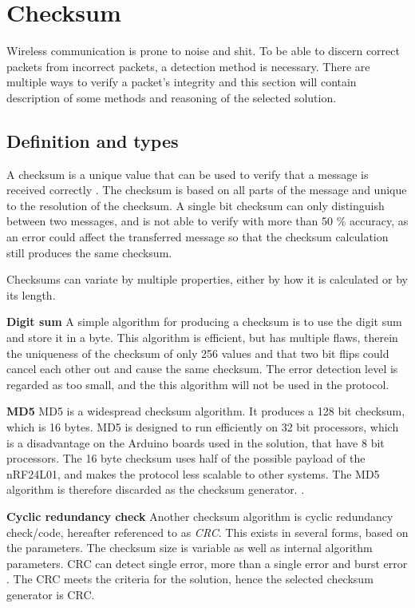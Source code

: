 \section{Checksum}
Wireless communication is prone to noise and shit\cite{source}. To be able to discern correct packets from incorrect packets, a detection method is necessary. There are multiple ways to verify a packet's integrity and this section will contain description of some methods and reasoning of the selected solution.

\subsection{Definition and types}
A checksum is a unique value that can be used to verify that a message is received correctly \cite{datapakke}. The checksum is based on all parts of the message and unique to the resolution of the checksum. 
A single bit checksum can only distinguish between two messages, and is not able to verify with more than 50 \% accuracy, as an error could affect the transferred message so that the checksum calculation still produces the same checksum.

Checksums can variate by multiple properties, either by how it is calculated or by its length. 

\textbf{Digit sum}\newline
A simple algorithm for producing a checksum is to use the digit sum and store it in a byte. This algorithm is efficient, but has multiple flaws, therein the uniqueness of the checksum of only 256 values and that two bit flips could cancel each other out and cause the same checksum. The error detection level is regarded as too small, and the this algorithm will not be used in the protocol.

\textbf{MD5}\newline
MD5 is a widespread checksum algorithm. It produces a 128 bit checksum, which is 16 bytes. MD5 is designed to run efficiently on 32 bit processors, which is a disadvantage on the Arduino boards used in the solution, that have 8 bit processors. The 16 byte checksum uses half of the possible payload of the nRF24L01, and makes the protocol less scalable to other systems. The MD5 algorithm is therefore discarded as the checksum generator. \cite[p.~308]{boyles2010ccna}.

\textbf{Cyclic redundancy check}\newline
Another checksum algorithm is cyclic redundancy check/code, hereafter referenced to as \textit{CRC}. This exists in several forms, based on the parameters. The checksum size is variable as well as internal algorithm parameters. CRC can detect single error, more than a single error and burst error \cite[p.~31]{elahi2001network}. The CRC meets the criteria for the solution, hence the selected checksum generator is CRC.

